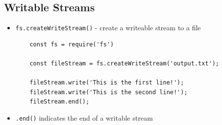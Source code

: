 \documentclass[12pt]{article}
\begin{document}
\subsection{Writable Streams}
\begin{itemize}
    \item \texttt{fs.createWriteStream()} - create a writeable stream to a file


\begin{lstlisting}
    const fs = require('fs')

    const fileStream = fs.createWriteStream('output.txt');

    fileStream.write('This is the first line!');
    fileStream.write('This is the second line!');
    fileStream.end();
\end{lstlisting}

    \item \texttt{.end()} indicates the end of a writable stream
\end{itemize}
\end{document}
